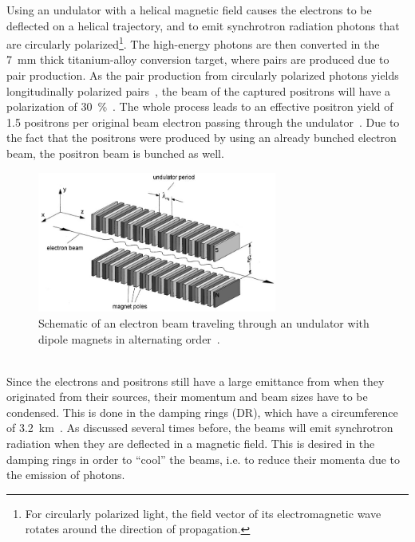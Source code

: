 Using an undulator with a helical magnetic field causes the electrons to be deflected on a helical trajectory, and to emit synchrotron radiation photons that are circularly polarized\footnote{For circularly polarized light, the field vector of its electromagnetic wave rotates around the direction of propagation.}.
The high-energy photons are then converted in the \SI{7}{\milli\meter} thick titanium-alloy conversion target, where \positron \electron pairs are produced due to pair production.
As the pair production from circularly polarized photons yields longitudinally polarized \positron \electron pairs~\cite{Polarization}, the beam of the captured positrons will have a polarization of \SI{30}{\percent}~\cite[p. 14]{TDR32}.
The whole process leads to an effective positron yield of 1.5 positrons per original beam electron passing through the undulator~\cite{Ushakov}.
Due to the fact that the positrons were produced by using an already bunched electron beam, the positron beam is bunched as well. 
\begin{figure}
\centering
\includegraphics[width=0.7\textwidth]{Figures/Undulator_edited.png}
\caption[Schematic layout of an undulator]{Schematic of an electron beam traveling through an undulator with dipole magnets in alternating order~\cite[based on p. 41]{Wille}.}
\label{fig:Undulator}
\end{figure}
\\
Since the electrons and positrons still have a large emittance from when they originated from their sources, their momentum and beam sizes have to be condensed.
This is done in the damping rings (DR), which have a circumference of \SI{3.2}{\kilo\meter}~\cite[p. 14]{TDR32}.
As discussed several times before, the beams will emit synchrotron radiation when they are deflected in a magnetic field.
This is desired in the damping rings in order to ``cool'' the beams, i.e. to reduce their momenta due to the emission of photons.
